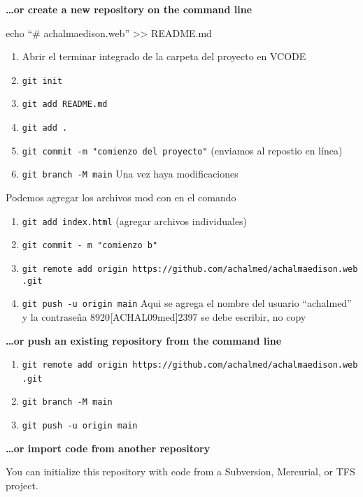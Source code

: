 \documentclass[
  a2paper,
]{article}
\providecommand{\tightlist}{%
  \setlength{\itemsep}{0pt}\setlength{\parskip}{0pt}}\usepackage{longtable,booktabs,array}
\begin{document}
\textbf{\ldots or create a new repository on the command line}

echo ``\# achalmaedison.web'' \textgreater\textgreater{} README.md~~

\begin{enumerate}
\def\labelenumi{\arabic{enumi}.}
\tightlist
\item
  Abrir el terminar integrado de la carpeta del proyecto en VCODE
\item
  \texttt{git\ init}
\item
  \texttt{git\ add\ README.md}
\item
  \texttt{git\ add\ .}
\item
  \texttt{git\ commit\ -m\ "comienzo\ del\ proyecto"} (enviamos al
  repostio en línea)
\item
  \texttt{git\ branch\ -M\ main} Una vez haya modificaciones~~
\end{enumerate}

Podemos agregar los archivos mod con en el comando~~

\begin{enumerate}
\def\labelenumi{\arabic{enumi}.}
\setcounter{enumi}{6}
\tightlist
\item
  \texttt{git\ add\ index.html} (agregar archivos individuales)
\item
  \texttt{git\ commit\ -\ m\ "comienzo\ b"}
\item
  \texttt{git\ remote\ add\ origin~https://github.com/achalmed/achalmaedison.web.git}
\item
  \texttt{git\ push\ -u\ origin\ main} Aqui se agrega el nombre del
  usuario ``achalmed'' y la contraseña 8920{[}ACHAL09med{]}2397 se debe
  escribir, no copy
\end{enumerate}

\textbf{\ldots or push an existing repository from the command line}

\begin{enumerate}
\def\labelenumi{\arabic{enumi}.}
\tightlist
\item
  \texttt{git\ remote\ add\ origin\ https://github.com/achalmed/achalmaedison.web.git}~~
\item
  \texttt{git\ branch\ -M\ main}
\item
  \texttt{git\ push\ -u\ origin\ main}
\end{enumerate}

\textbf{\ldots or import code from another repository}

You can initialize this repository with code from a Subversion,
Mercurial, or TFS project.
\end{document}
